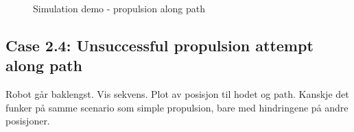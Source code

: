 \begin{figure}
    \caption{Simulation demo - propulsion along path}
    \label{fig:case2-3}
\end{figure}


\subsection{Case 2.4: Unsuccessful propulsion attempt along path}
Robot går baklengst.
Vis sekvens. Plot av posisjon til hodet og path.
Kanskje det funker på samme scenario som simple propulsion, bare med hindringene på andre posisjoner.


